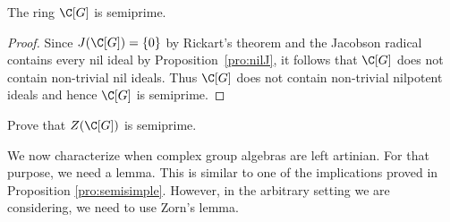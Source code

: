 



\begin{corollary}
\label{cor:C[G]_semiprime}
	The ring $\C[G]$ is semiprime.
\end{corollary}

\begin{proof}
	Since $J(\C[G])=\{0\}$ by Rickart's theorem and the Jacobson radical
	contains every nil ideal by Proposition~\ref{pro:nilJ}, it follows that
	$\C[G]$ does not contain non-trivial nil ideals. Thus $\C[G]$ does not
	contain non-trivial nilpotent ideals and hence $\C[G]$ is semiprime.
\end{proof}

\begin{exercise}
	Prove that $Z(\C[G])$ is semiprime.
\end{exercise}

We now characterize when complex group algebras 
are left artinian. For that purpose,
we need a lemma. This is similar to one of the implications proved in Proposition \ref{pro:semisimple}. However,
in the arbitrary setting we are considering, we need to use Zorn's lemma. 

